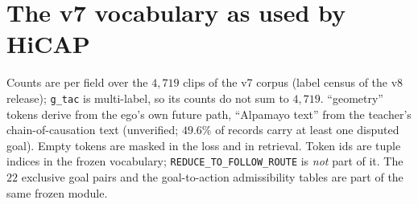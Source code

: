 \section{The v7 vocabulary as used by HiCAP}\label{app:vocab}
Counts are per field over the $4{,}719$ clips of the v7 corpus (label census of the v8 release)\evI; \texttt{g\_tac} is multi-label, so its counts do not sum to $4{,}719$. ``geometry'' tokens derive from the ego's own future path, ``Alpamayo text'' from the teacher's chain-of-causation text (unverified; $49.6\%$ of records carry at least one disputed goal). Empty tokens are masked in the loss and in retrieval.
Token ids are tuple indices in the frozen vocabulary; \texttt{REDUCE\_TO\_FOLLOW\_ROUTE} is \emph{not} part of it. The $22$ exclusive goal pairs and the goal-to-action admissibility tables are part of the same frozen module.
